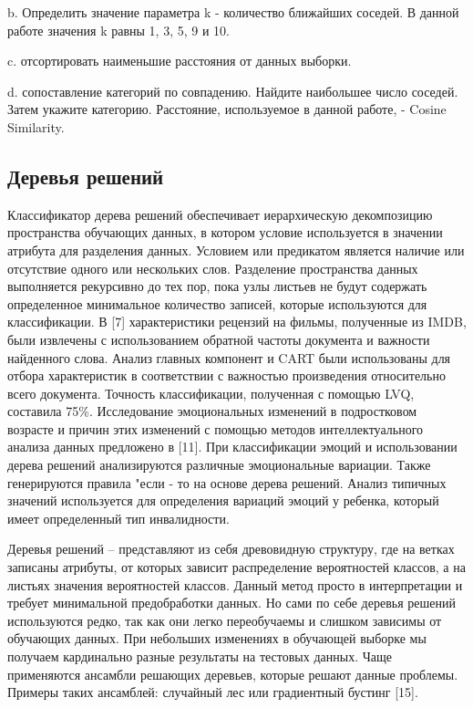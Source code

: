 b. Определить значение параметра k - количество ближайших соседей. В данной
работе значения k равны 1, 3, 5, 9 и 10. 

c. отсортировать наименьшие расстояния от данных выборки.

d. сопоставление категорий по совпадению. Найдите наибольшее число соседей.
Затем укажите категорию.  Расстояние, используемое в данной работе, - Cosine
Similarity.

\subsection{Деревья решений}

Классификатор дерева решений обеспечивает иерархическую декомпозицию
пространства обучающих данных, в котором условие используется в значении
атрибута для разделения данных. Условием или предикатом является наличие или
отсутствие одного или нескольких слов. Разделение пространства данных
выполняется рекурсивно до тех пор, пока узлы листьев не будут содержать
определенное минимальное количество записей, которые используются для
классификации. В [7] характеристики рецензий на фильмы, полученные из IMDB,
были извлечены с использованием обратной частоты документа и важности найденного
слова. Анализ главных компонент и CART были использованы для отбора
характеристик в соответствии с важностью произведения относительно всего
документа. Точность классификации, полученная с помощью LVQ, составила 75\%.
Исследование эмоциональных изменений в подростковом возрасте и причин этих
изменений с помощью методов интеллектуального анализа данных предложено в [11].
При классификации эмоций и использовании дерева решений анализируются различные
эмоциональные вариации. Также генерируются правила "если - то на основе дерева
решений. Анализ типичных значений используется для определения вариаций эмоций у
ребенка, который имеет определенный тип инвалидности.~\cite{article4}

Деревья решений – представляют из себя древовидную структуру, где на ветках
записаны атрибуты, от которых зависит распределение вероятностей классов, а на
листьях значения вероятностей классов. Данный метод просто в интерпретации и
требует минимальной предобработки данных. Но сами по себе деревья решений
используются редко, так как они легко переобучаемы и слишком зависимы от
обучающих данных. При небольших изменениях в обучающей выборке мы получаем
кардинально разные результаты на тестовых данных. Чаще применяются ансамбли
решающих деревьев, которые решают данные проблемы. Примеры таких ансамблей:
случайный лес или градиентный бустинг [15].~\cite{article9}

